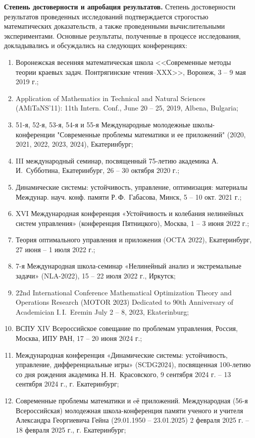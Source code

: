 \textbf{Степень достоверности и апробация результатов.} Степень достоверности результатов проведенных исследований подтверждается строгостью математических доказательств, а также проведенными вычислительными экспериментами.
Основные результаты, полученные в процессе исследования, докладывались и обсуждались на следующих конференциях:
\begin{enumerate}
	\item Воронежская весенняя математическая школа <<Современные методы теории краевых задач. Понтрягинские чтения–XXX>>, Воронеж, 3 -- 9 мая 2019 г.;
	\item Application of Mathematics in Technical and Natural Sciences \\ (AMiTaNS'11): 11th Intern. Conf., June 20 -- 25, 2019, Albena, Bulgaria;
	\item 51-я, 52-я, 53-я, 54-я и 55-я Международные молодежные школы-конференции "Современные проблемы математики и ее приложений" (2020, 2021, 2022, 2023, 2024), Екатеринбург;
	\item III международный семинар, посвященный 75-летию академика А.\,И.~Субботина, Екатеринбург, 26 -- 30 октября 2020 г.;
	\item Динамические системы: устойчивость, управление, оптимизация: материалы Междунар. науч. конф. памяти Р.\,Ф.~Габасова, Минск, 5 -- 10 окт. 2021 г.;
	\item XVI Международная конференция «Устойчивость и колебания нелинейных систем управления» (конференция Пятницкого), Москва, 1 -- 3 июня 2022 г.;
	\item Теория оптимального управления и приложения (OCTA 2022), Екатеринбург, 27 июня -- 1 июля 2022 г.;
	\item 7-я Международная школа-семинар «Нелинейный анализ и экстремальные задачи» (NLA-2022), 15 -- 22 июля 2022 г., Иркутск;
	\item 22nd International Conference Mathematical Optimization Theory and Operations Research (MOTOR 2023) Dedicated to 90th Anniversary of Academician I.\,I.~Eremin July 2 -- 8, 2023, Ekaterinburg;
	\item ВСПУ XIV Всероссийское совещание по проблемам управления, Россия, Москва, ИПУ РАН, 17 -- 20 июня 2024 г.;
	\item Международная конференция «Динамические системы: устойчивость, управление, дифференциальные игры» (SCDG2024), посвященная 100-летию со дня рождения академика Н.\,Н.~Красовского, 9 сентября 2024 г. -- 13 сентября 2024 г., г. Екатеринбург;
	\item Современные проблемы математики и eё приложений. Международная (56-я Всероссийская) молодежная школа-конференция памяти ученого и учителя Александра Георгиевича Гейна (29.01.1950 – 23.01.2025) 2 февраля 2025 г. -- 18 февраля 2025 г., г. Екатеринбург;
\end{enumerate}


